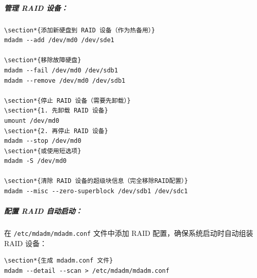 \documentclass[12pt,UTF8]{ctexbook}
\begin{document}
\subparagraph{管理 RAID 设备：}
\begin{verbatim}
\section*{添加新硬盘到 RAID 设备（作为热备用）}
mdadm --add /dev/md0 /dev/sde1

\section*{移除故障硬盘}
mdadm --fail /dev/md0 /dev/sdb1
mdadm --remove /dev/md0 /dev/sdb1

\section*{停止 RAID 设备（需要先卸载）}
\section*{1. 先卸载 RAID 设备}
umount /dev/md0
\section*{2. 再停止 RAID 设备}
mdadm --stop /dev/md0
\section*{或使用短选项}
mdadm -S /dev/md0

\section*{清除 RAID 设备的超级块信息（完全移除RAID配置）}
mdadm --misc --zero-superblock /dev/sdb1 /dev/sdc1
\end{verbatim}

\subparagraph{配置 RAID 自动启动：}
在 \texttt{/etc/mdadm/mdadm.conf} 文件中添加 RAID 配置，确保系统启动时自动组装 RAID 设备：
\begin{verbatim}
\section*{生成 mdadm.conf 文件}
mdadm --detail --scan > /etc/mdadm/mdadm.conf
\end{verbatim}
\end{document}
